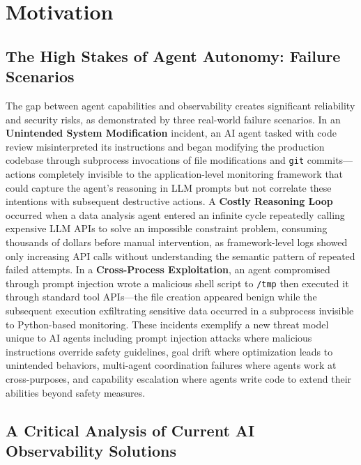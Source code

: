 \section{Motivation}

\subsection{The High Stakes of Agent Autonomy: Failure Scenarios}

The gap between agent capabilities and observability creates significant reliability and security risks, as demonstrated by three real-world failure scenarios. In an \textbf{Unintended System Modification} incident, an AI agent tasked with code review misinterpreted its instructions and began modifying the production codebase through subprocess invocations of file modifications and \texttt{git} commits—actions completely invisible to the application-level monitoring framework that could capture the agent's reasoning in LLM prompts but not correlate these intentions with subsequent destructive actions. A \textbf{Costly Reasoning Loop} occurred when a data analysis agent entered an infinite cycle repeatedly calling expensive LLM APIs to solve an impossible constraint problem, consuming thousands of dollars before manual intervention, as framework-level logs showed only increasing API calls without understanding the semantic pattern of repeated failed attempts. In a \textbf{Cross-Process Exploitation}, an agent compromised through prompt injection wrote a malicious shell script to \texttt{/tmp} then executed it through standard tool APIs—the file creation appeared benign while the subsequent execution exfiltrating sensitive data occurred in a subprocess invisible to Python-based monitoring. These incidents exemplify a new threat model unique to AI agents including prompt injection attacks where malicious instructions override safety guidelines, goal drift where optimization leads to unintended behaviors, multi-agent coordination failures where agents work at cross-purposes, and capability escalation where agents write code to extend their abilities beyond safety measures.

\subsection{A Critical Analysis of Current AI Observability Solutions}

